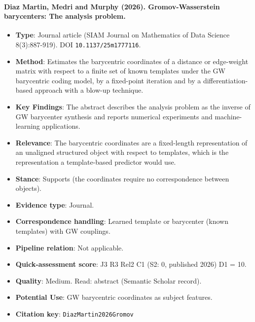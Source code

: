 \documentclass[journal,onecolumn]{IEEEtran}
\begin{document}
\paragraph{Diaz Martin, Medri and Murphy (2026). Gromov-Wasserstein barycenters: The analysis problem.~\cite{DiazMartin2026Gromov}}\mbox{}

\begin{itemize}

\item{} \textbf{Type}: Journal article (SIAM Journal on Mathematics of Data Science 8(3):887-919). DOI \nolinkurl{10.1137/25m1777116}.

\item{} \textbf{Method}: Estimates the barycentric coordinates of a distance or edge-weight matrix with respect to a finite set of known templates under the GW barycentric coding model, by a fixed-point iteration and by a differentiation-based approach with a blow-up technique.

\item{} \textbf{Key Findings}: The abstract describes the analysis problem as the inverse of GW barycenter synthesis and reports numerical experiments and machine-learning applications.

\item{} \textbf{Relevance}: The barycentric coordinates are a fixed-length representation of an unaligned structured object with respect to templates, which is the representation a template-based predictor would use.

\item{} \textbf{Stance}: Supports (the coordinates require no correspondence between objects).

\item{} \textbf{Evidence type}: Journal.

\item{} \textbf{Correspondence handling}: Learned template or barycenter (known templates) with GW couplings.

\item{} \textbf{Pipeline relation}: Not applicable.

\item{} \textbf{Quick-assessment score}: J3 R3 Rel2 C1 (S2: 0, published 2026) D1 = 10.

\item{} \textbf{Quality}: Medium. Read: abstract (Semantic Scholar record).

\item{} \textbf{Potential Use}: GW barycentric coordinates as subject features.

\item{} \textbf{Citation key}: \texttt{DiazMartin2026Gromov}

\end{itemize}
\end{document}
